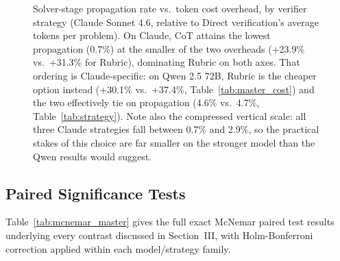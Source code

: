 \documentclass[11pt]{article}
\begin{document}
\begin{figure}[H]
\centering
{}
\caption{Solver-stage propagation rate vs.\ token cost overhead, by verifier strategy (Claude
Sonnet 4.6, relative to Direct verification's average tokens per problem). On Claude, CoT
attains the lowest propagation (0.7\%) at the smaller of the two overheads (+23.9\% vs.\
+31.3\% for Rubric), dominating Rubric on both axes. That ordering is Claude-specific: on
Qwen 2.5 72B, Rubric is the cheaper option instead (+30.1\% vs.\ +37.4\%,
Table~\ref{tab:master_cost}) and the two effectively tie on propagation (4.6\% vs.\ 4.7\%,
Table~\ref{tab:strategy}). Note also the compressed vertical scale: all three Claude
strategies fall between 0.7\% and 2.9\%, so the practical stakes of this choice are far
smaller on the stronger model than the Qwen results would suggest.}\label{fig:tradeoff}
\end{figure}

\subsection{Paired Significance Tests}
Table~\ref{tab:mcnemar_master} gives the full exact McNemar paired test results underlying every contrast discussed in Section~III, with Holm-Bonferroni correction applied within each model/strategy family.
\end{document}
